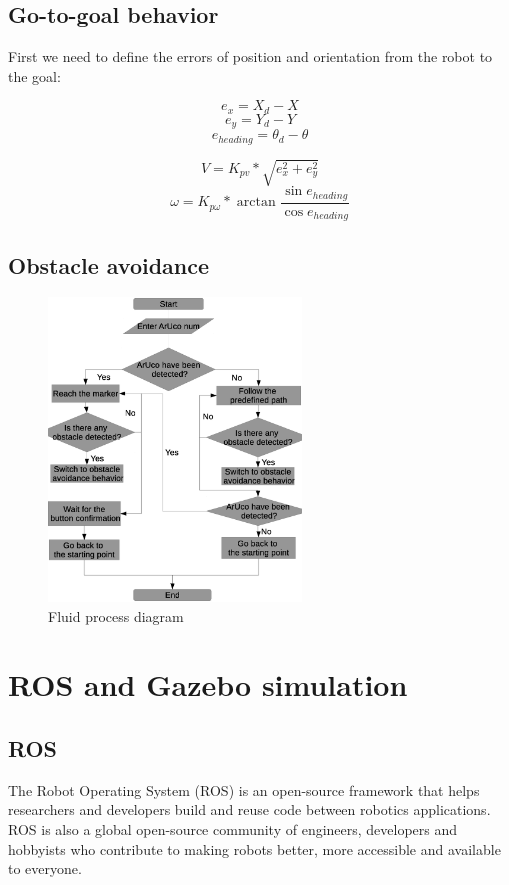 \subsection{Go-to-goal behavior}

First we need to define the errors of position and orientation from the robot to the goal:

\[e_x=X_d-X\]
\[e_y=Y_d-Y\]
\[e_{heading}=\theta_d-\theta\]


\[V=K_{pv}*\sqrt{e_x^2+e_y^2}\]
\[\omega=K_{p\omega}*\arctan{\frac{\sin{e_{heading}}}{\cos{e_{heading}}}}\]




\subsection{Obstacle avoidance}


\begin{figure}[h!]
    \centering
 	\includegraphics[trim=0 0 0 0,clip,width=0.6\textwidth]{Figs/Flowchart.eps}
    \caption{Fluid process diagram}
    \label{fig:Chessboard}
\end{figure}

\section{ROS and Gazebo simulation}
\subsection{ROS}
The Robot Operating System (ROS) is an open-source framework that helps researchers and developers build and reuse code between robotics applications. ROS is also a global open-source community of engineers, developers and hobbyists who contribute to making robots better, more accessible and available to everyone.
